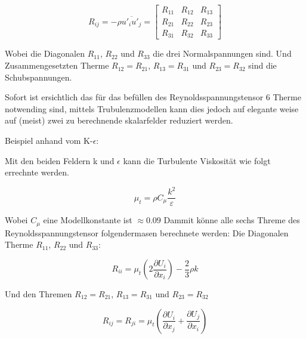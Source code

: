 \begin{equation}
    R_{ij} = -\rho\overline{u'_i u'_j} = \begin{bmatrix}
    R_{11} & R_{12} & R_{13} \\
    R_{21} & R_{22} & R_{23} \\
    R_{31} & R_{32} & R_{33}
    \end{bmatrix}
\end{equation}

Wobei die Diagonalen $R_{11}$, $R_{22}$ und $R_{33}$ die drei Normalspannungen sind.
Und Zusammengesetzten Therme $R_{12} = R_{21}$, $R_{13} = R_{31}$ und $R_{23} = R_{32}$ sind die Schubspannungen.

Sofort ist ersichtlich das für das befüllen des Reynoldsspannungstensor 6 Therme notwending sind,
mittels Trubulenzmodellen kann dies jedoch auf elegante weise auf (meist) zwei zu berechnende skalarfelder reduziert werden.

Beispiel anhand vom K-$\epsilon$:

Mit den beiden Feldern k und $\epsilon$ kann die Turbulente Viskosität wie folgt errechnte werden.

\begin{equation}
    \mu_t = \rho C_\mu \frac{k^2}{\varepsilon}
\end{equation}

Wobei $C_\mu$ eine Modellkonstante ist $\approx 0.09$
Dammit könne alle sechs Threme des Reynoldsspannungstensor folgendermasen berechnete werden:
Die Diagonalen Therme $R_{11}$, $R_{22}$ und $R_{33}$:

\begin{equation}
    R_{ii} = \mu_t \left(2\frac{\partial U_i}{\partial x_i}\right) - \frac{2}{3}\rho k
\end{equation}

Und den Thremen $R_{12} = R_{21}$, $R_{13} = R_{31}$ und $R_{23} = R_{32}$

\begin{equation}
    R_{ij} = R_{ji} = \mu_t \left(\frac{\partial U_i}{\partial x_j} + \frac{\partial U_j}{\partial x_i}\right)
\end{equation}